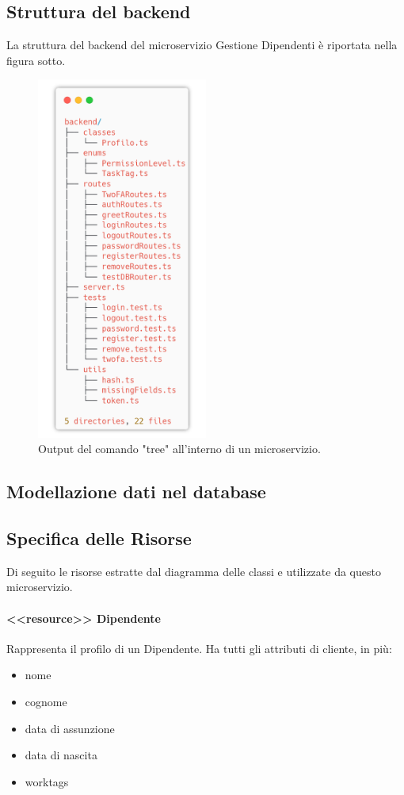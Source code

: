 \documentclass{report}
\begin{document}
\subsection*{Struttura del backend}
La struttura del backend del microservizio Gestione Dipendenti è riportata
nella figura sotto.
\begin{figure}[H]
	\centering\includegraphics[width=0.5\textwidth]{images/microservizio-autenticazione/backend-structure.png}
	\caption{Output del comando "tree" all'interno di un microservizio.}
\end{figure}
\subsection*{Modellazione dati nel database}
\subsection*{Specifica delle Risorse}
Di seguito le risorse estratte dal diagramma delle classi e utilizzate da questo microservizio.
\paragraph*{<<resource>> Dipendente}
Rappresenta il profilo di un Dipendente.
Ha tutti gli attributi di cliente, in più:
\begin{itemize}
	\item nome
	\item cognome
	\item data di assunzione
	\item data di nascita
	\item worktags
\end{itemize}
\end{document}
